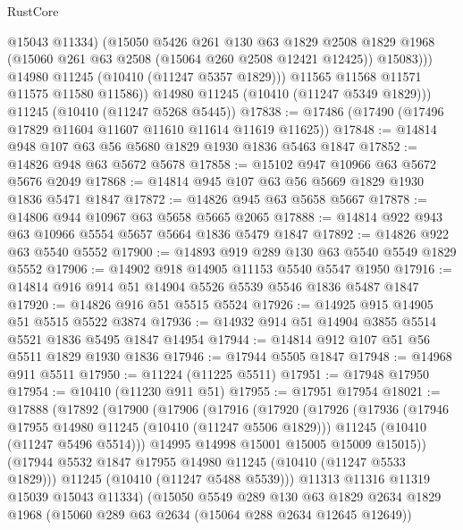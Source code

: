 \begin{lexlean}{RustCore}
\begin{coremodule}
                  @15043
                  @11334)
                (@15050
                  @5426
                  @261
                  @130
                  @63
                  @1829
                  @2508
                  @1829
                  @1968
                  (@15060 @261 @63 @2508 (@15064 @260 @2508 @12421 @12425))
                  @15083)))
            @14980
            @11245
            (@10410 (@11247 @5357 @1829)))
          @11565
          @11568
          @11571
          @11575
          @11580
          @11586))
      @14980
      @11245
      (@10410 (@11247 @5349 @1829)))
    @11245
    (@10410 (@11247 @5268 @5445))
@17838 := @17486 (@17490 (@17496 @17829 @11604 @11607 @11610 @11614 @11619 @11625))
@17848 := @14814 @948 @107 @63 @56 @5680 @1829 @1930 @1836 @5463 @1847
@17852 := @14826 @948 @63 @5672 @5678
@17858 := @15102 @947 @10966 @63 @5672 @5676 @2049
@17868 := @14814 @945 @107 @63 @56 @5669 @1829 @1930 @1836 @5471 @1847
@17872 := @14826 @945 @63 @5658 @5667
@17878 := @14806 @944 @10967 @63 @5658 @5665 @2065
@17888 := @14814 @922 @943 @63 @10966 @5554 @5657 @5664 @1836 @5479 @1847
@17892 := @14826 @922 @63 @5540 @5552
@17900 := @14893 @919 @289 @130 @63 @5540 @5549 @1829 @5552
@17906 := @14902 @918 @14905 @11153 @5540 @5547 @1950
@17916 := @14814 @916 @914 @51 @14904 @5526 @5539 @5546 @1836 @5487 @1847
@17920 := @14826 @916 @51 @5515 @5524
@17926 := @14925 @915 @14905 @51 @5515 @5522 @3874
@17936 := @14932 @914 @51 @14904 @3855 @5514 @5521 @1836 @5495 @1847 @14954
@17944 := @14814 @912 @107 @51 @56 @5511 @1829 @1930 @1836
@17946 := @17944 @5505 @1847
@17948 := @14968 @911 @5511
@17950 := @11224 (@11225 @5511)
@17951 := @17948 @17950
@17954 := @10410 (@11230 @911 @51)
@17955 := @17951 @17954
@18021 := @17888
    (@17892
      (@17900
        (@17906
          (@17916
            (@17920
              (@17926
                (@17936
                  (@17946 @17955 @14980 @11245 (@10410 (@11247 @5506 @1829)))
                  @11245
                  (@10410 (@11247 @5496 @5514)))
                @14995
                @14998
                @15001
                @15005
                @15009
                @15015))
            (@17944 @5532 @1847 @17955 @14980 @11245 (@10410 (@11247 @5533 @1829)))
            @11245
            (@10410 (@11247 @5488 @5539)))
          @11313
          @11316
          @11319
          @15039
          @15043
          @11334)
        (@15050
          @5549
          @289
          @130
          @63
          @1829
          @2634
          @1829
          @1968
          (@15060 @289 @63 @2634 (@15064 @288 @2634 @12645 @12649))

\end{coremodule}
\end{lexlean}
